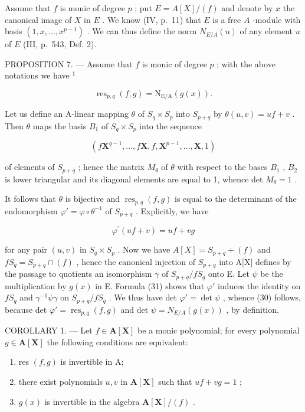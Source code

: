 Assume that \(f\) is monic of degree \(p\) ; put \(E = A[X]/(f)\) and denote by \(x\) the canonical image of \(X\) in \(E\) . We know (IV, p.~11) that \(E\) is a free \(A\) -module with basis \((1, x, ..., x^{p-1})\) . We can thus define the norm \(N_{E/A}(u)\) of any element \(u\) of \(E\) (III, p.~543, Def. 2).

PROPOSITION 7. --- Assume that \(f\) is monic of degree \(p\) ; with the above notations we have \(^{1}\)

\[
\operatorname{res} _ {p, q} (f, g) = \mathrm{N} _ {\mathrm{E/A}} (g (x)).\tag{30}
\]

Let us define an A-linear mapping \(\theta\) of \(S_q \times S_p\) into \(S_{p+q}\) by \(\theta(u, v) = uf + v\) . Then \(\theta\) maps the basis \(B_1\) of \(S_q \times S_p\) into the sequence

\[
(f \mathbf {X} ^ {q - 1}, \dots , f \mathbf {X}, f, \mathbf {X} ^ {p - 1}, \dots , \mathbf {X}, 1)
\]

of elements of \(S_{p+q}\) ; hence the matrix \(M_{\theta}\) of \(\theta\) with respect to the bases \(B_{1}\) , \(B_{2}\) is lower triangular and its diagonal elements are equal to 1, whence det \(M_{\theta}=1\) .

It follows that \(\theta\) is bijective and \(\operatorname{res}_{p,q}(f,g)\) is equal to the determinant of the endomorphism \(\varphi' = \varphi \circ \theta^{-1}\) of \(S_{p + q}\) . Explicitly, we have

\[
\varphi^ {\prime} (u f + v) = u f + v g\tag{31}
\]

for any pair \((u,v)\) in \(S_{q}\times S_{p}\) . Now we have \(A[X]=S_{p+q}+(f)\) and \(fS_{q}=S_{p+q}\cap(f)\) , hence the canonical injection of \(S_{p+q}\) into A{[}X{]} defines by the passage to quotients an isomorphism \(\gamma\) of \(S_{p+q}/fS_{q}\) onto E. Let \(\psi\) be the multiplication by \(g(x)\) in E. Formula (31) shows that \(\varphi'\) induces the identity on \(fS_{q}\) and \(\gamma^{-1}\psi\gamma\) on \(S_{p+q}/fS_{q}\) . We thus have det \(\varphi'=\det\psi\) , whence (30) follows, because det \(\varphi'=\operatorname{res}_{p,q}(f,g)\) and det \(\psi=N_{E/A}(g(x))\) , by definition.

COROLLARY 1. --- Let \(f \in \mathbf{A}[\mathbf{X}]\) be a monic polynomial; for every polynomial \(g \in \mathbf{A}[\mathbf{X}]\) the following conditions are equivalent:

\begin{enumerate}
\def\labelenumi{(\roman{enumi})}
\item
  res \((f,g)\) is invertible in A;
\item
  there exist polynomials \(u, v\) in \(\mathbf{A}[\mathbf{X}]\) such that \(uf + vg = 1\) ;
\item
  \(g(x)\) is invertible in the algebra \(\mathbf{A}[\mathbf{X}] / (f)\) .
\end{enumerate}

